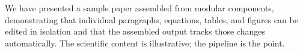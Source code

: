 We have presented a sample paper assembled from modular components,
demonstrating that individual paragraphs, equations, tables, and
figures can be edited in isolation and that the assembled output
tracks those changes automatically. The scientific content is
illustrative; the pipeline is the point.
